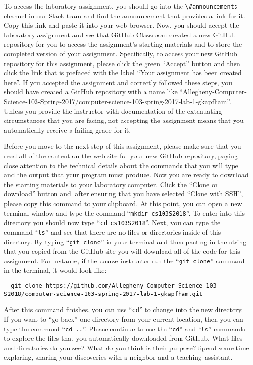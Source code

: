 \documentclass[11pt]{article}
\newcommand{\command}[1]{``\lstinline{#1}''}
\newcommand{\channel}[1]{\lstinline{#1}}
\newcommand{\step}[1]{``{#1}''}
\begin{document}
To access the laboratory assignment, you should go into the \channel{\#announcements} channel in our Slack team and find
the announcement that provides a link for it. Copy this link and paste it into your web browser. Now, you should accept
the laboratory assignment and see that GitHub Classroom created a new GitHub repository for you to access the
assignment's starting materials and to store the completed version of your assignment. Specifically, to access your new
GitHub repository for this assignment, please click the green ``Accept'' button and then click the link that is prefaced
with the label ``Your assignment has been created here''. If you accepted the assignment and correctly followed these
steps, you should have created a GitHub repository with a name like
``Allegheny-Computer-Science-103-Spring-2017/computer-science-103-spring-2017-lab-1-gkapfham''. Unless you provide the
instructor with documentation of the extenuating circumstances that you are facing, not accepting the assignment means
that you automatically receive a failing grade for it.

Before you move to the next step of this assignment, please make sure that you read all of the content on the web site
for your new GitHub repository, paying close attention to the technical details about the commands that you will type
and the output that your program must produce. Now you are ready to download the starting materials to your laboratory
computer. Click the ``Clone or download'' button and, after ensuring that you have selected ``Clone with SSH'', please
copy this command to your clipboard. At this point, you can open a new terminal window and type the command
\command{mkdir cs103S2018}. To enter into this directory you should now type \command{cd cs103S2018}. Next, you can type
the command \command{ls} and see that there are no files or directories inside of this directory. By typing \command{git
clone} in your terminal and then pasting in the string that you copied from the GitHub site you will download all of the
code for this assignment. For instance, if the course instructor ran the \command{git clone} command in the terminal, it
would look like:

\begin{lstlisting}
  git clone https://github.com/Allegheny-Computer-Science-103-S2018/computer-science-103-spring-2017-lab-1-gkapfham.git
\end{lstlisting}

After this command finishes, you can use \command{cd} to change into the new directory. If you want to \step{go back}
one directory from your current location, then you can type the command \command{cd ..}. Please continue to use the
\command{cd} and \command{ls} commands to explore the files that you automatically downloaded from GitHub. What files
and directories do you see? What do you think is their purpose? Spend some time exploring, sharing your discoveries with
a neighbor and a \mbox{teaching assistant}.
\end{document}

